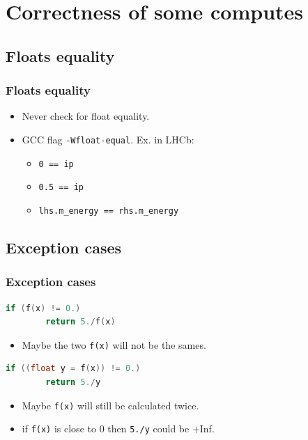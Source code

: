 \documentclass{beamer}
\begin{document}
\section{Correctness of some computes}

\begin{frame}
    \tableofcontents[currentsection]
\end{frame}

\subsection{Floats equality}

\begin{frame}[fragile]
    \frametitle{Floats equality}

    \begin{itemize}
        \item Never check for float equality.
        \item GCC flag \verb'-Wfloat-equal'.
              Ex. in LHCb:
              \begin{itemize}
                  \item \verb'0 == ip'
                  \item \verb'0.5 == ip'
                  \item \verb'lhs.m_energy == rhs.m_energy'
              \end{itemize}
    \end{itemize}
\end{frame}

\subsection{Exception cases}

\begin{frame}[fragile]
    \frametitle{Exception cases}

    \begin{lstlisting}[language=c++]
if (f(x) != 0.)
        return 5./f(x)
    \end{lstlisting}

    \begin{itemize}
        \item Maybe the two \verb'f(x)' will not be the sames.
    \end{itemize}
\end{frame}

\begin{frame}[fragile]
    \begin{lstlisting}[language=c++]
if ((float y = f(x)) != 0.)
        return 5./y
    \end{lstlisting}

    \begin{itemize}
        \item Maybe \verb'f(x)' will still be calculated twice.
        \item if \verb'f(x)' is close to $0$ then \verb'5./y' could be +Inf.
    \end{itemize}
\end{frame}
\end{document}
